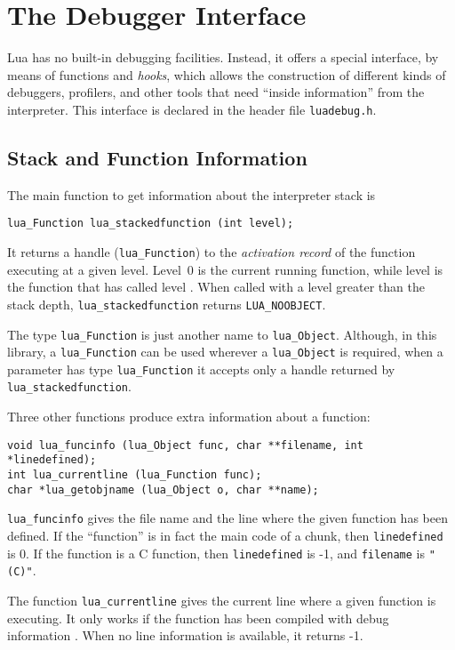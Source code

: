 \section{The Debugger Interface} \label{debugI}

Lua has no built-in debugging facilities.
Instead, it offers a special interface,
by means of functions and \emph{hooks},
which allows the construction of different
kinds of debuggers, profilers, and other tools
that need ``inside information'' from the interpreter.
This interface is declared in the header file \verb|luadebug.h|.

\subsection{Stack and Function Information}

The main function to get information about the interpreter stack
is
\begin{verbatim}
lua_Function lua_stackedfunction (int level);
\end{verbatim}
It returns a handle (\verb|lua_Function|) to the \emph{activation record}
of the function executing at a given level.
Level~0 is the current running function,
while level  is the function that has called level .
When called with a level greater than the stack depth,
\verb|lua_stackedfunction| returns \verb|LUA_NOOBJECT|.

The type \verb|lua_Function| is just another name
to \verb|lua_Object|.
Although, in this library,
a \verb|lua_Function| can be used wherever a \verb|lua_Object| is required,
when a parameter has type \verb|lua_Function|
it accepts only a handle returned by
\verb|lua_stackedfunction|.

Three other functions produce extra information about a function:
\begin{verbatim}
void lua_funcinfo (lua_Object func, char **filename, int *linedefined);
int lua_currentline (lua_Function func);
char *lua_getobjname (lua_Object o, char **name);
\end{verbatim}
\verb|lua_funcinfo| gives the file name and the line where the
given function has been defined.
If the ``function'' is in fact the main code of a chunk,
then \verb|linedefined| is 0.
If the function is a C function,
then \verb|linedefined| is -1, and \verb|filename| is \verb|"(C)"|.

The function \verb|lua_currentline| gives the current line where
a given function is executing.
It only works if the function has been compiled with debug
information .
When no line information is available, it returns -1.

